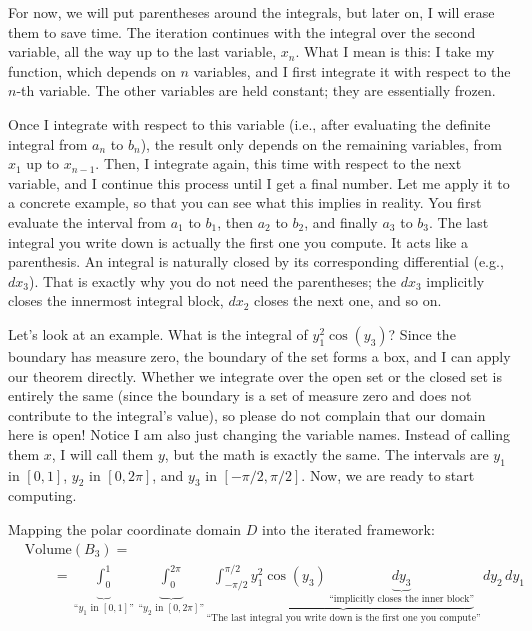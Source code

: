 \begin{spoken-clean}[00:08:02 - 00:10:22]
For now, we will put parentheses around the integrals, but later on, I will erase them to save time. The iteration continues with the integral over the second variable, all the way up to the last variable, $x_n$. What I mean is this: I take my function, which depends on $n$ variables, and I first integrate it with respect to the $n$-th variable. The other variables are held constant; they are essentially frozen. 

Once I integrate with respect to this variable (i.e., after evaluating the definite integral from $a_n$ to $b_n$), the result only depends on the remaining variables, from $x_1$ up to $x_{n-1}$. Then, I integrate again, this time with respect to the next variable, and I continue this process until I get a final number. Let me apply it to a concrete example, so that you can see what this implies in reality. You first evaluate the interval from $a_1$ to $b_1$, then $a_2$ to $b_2$, and finally $a_3$ to $b_3$. The last integral you write down is actually the first one you compute. It acts like a parenthesis. An integral is naturally closed by its corresponding differential (e.g., $dx_3$). That is exactly why you do not need the parentheses; the $dx_3$ implicitly closes the innermost integral block, $dx_2$ closes the next one, and so on. 
\end{spoken-clean}

\begin{spoken-clean}[00:10:22 - 00:12:46]
Let's look at an example. What is the integral of $y_1^2 \cos(y_3)$? Since the boundary has measure zero, the boundary of the set forms a box, and I can apply our theorem directly. Whether we integrate over the open set or the closed set is entirely the same (since the boundary is a set of measure zero and does not contribute to the integral's value), so please do not complain that our domain here is open! Notice I am also just changing the variable names. Instead of calling them $x$, I will call them $y$, but the math is exactly the same. The intervals are $y_1$ in $[0, 1]$, $y_2$ in $[0, 2\pi]$, and $y_3$ in $[-\pi/2, \pi/2]$. Now, we are ready to start computing.
\end{spoken-clean}

\begin{math-stroke}
Mapping the polar coordinate domain $D$ into the iterated framework:
\begin{align*}
  &\text{Volume}(B_3) = \\
  & \qquad = \underbrace{\int_{0}^{1}}_{\text{``} y_1 \text{ in } [0, 1] \text{''}} \underbrace{\int_{0}^{2\pi}}_{\text{``} y_2 \text{ in } [0, 2\pi] \text{''}} \underbrace{\int_{-\pi/2}^{\pi/2} y_1^2 \cos(y_3) \, \underbrace{dy_3}_{\text{``implicitly closes the inner block''}}}_{\text{``The last integral you write down is the first one you compute''}} \, dy_2 \, dy_1
\end{align*}
\end{math-stroke}

